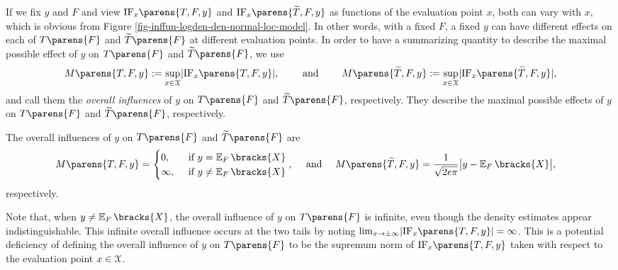 If we fix $y$ and $F$ and view $\mathrm{IF}_x \parens{T, F, y}$ and $\mathrm{IF}_x \parens{\widetilde{T}, F, y}$ as functions of the evaluation point $x$, both can vary with $x$, which is obvious from Figure \ref{fig-inffun-logden-den-normal-loc-model}. In other words, with a fixed $F$, a fixed $y$ can have different effects on each of $T \parens{F}$ and $\widetilde{T} \parens{F}$ at different evaluation points. In order to have a summarizing quantity to describe the maximal possible effect of $y$ on $T \parens{F}$ and $\widetilde{T} \parens{F}$, we use 
\begin{align*}
	M \parens{T, F, y} := \sup_{x \in \calX} \abs{\mathrm{IF}_x \parens{T, F, y}}, \qquad \text{ and } \qquad
	M \parens{\widetilde{T}, F, y} := \sup_{x \in \calX} \abs{\mathrm{IF}_x \parens{\widetilde{T}, F, y}}, 
\end{align*}
and call them the \textit{overall influences} of $y$ on $T \parens{F}$ and $\widetilde{T} \parens{F}$, respectively. They describe the maximal possible effects of $y$ on $T \parens{F}$ and $\widetilde{T} \parens{F}$, respectively. 

\renewcommand\thmcontinues[1]{continued}
\begin{example}[name=Normal location model, continues=example-normal-loc-model]
	The overall influences of $y$ on $T \parens{F}$ and $\widetilde{T} \parens{F}$ are 
	\begin{align*}
		M \parens{T, F, y} = & \, \begin{cases}
			0, & \, \text{ if } y = \E_F \bracks{X} \\ 
			\infty, & \, \text{ if } y \neq \E_F \bracks{X}
		\end{cases}, \quad \text{ and } \quad 
		M \parens{\widetilde{T}, F, y} = \frac{1}{\sqrt{2 e \pi}} \big\vert y - \E_F \bracks{X} \big\vert, 
	\end{align*}
	respectively. 
	
	Note that, when $y \neq \E_F \bracks{X}$, the overall influence of $y$ on $T \parens{F}$ is infinite, even though the density estimates appear indistinguishable. This infinite overall influence occurs at the two tails by noting $\lim_{x \to \pm \infty} \abs{\mathrm{IF}_x \parens{T, F, y}} = \infty$. This is a potential deficiency of defining the overall influence of $y$ on $T \parens{F}$ to be the supremum norm of $\mathrm{IF}_x \parens{T, F, y}$ taken with respect to the evaluation point $x \in \mathcal{X}$. 
\end{example}


